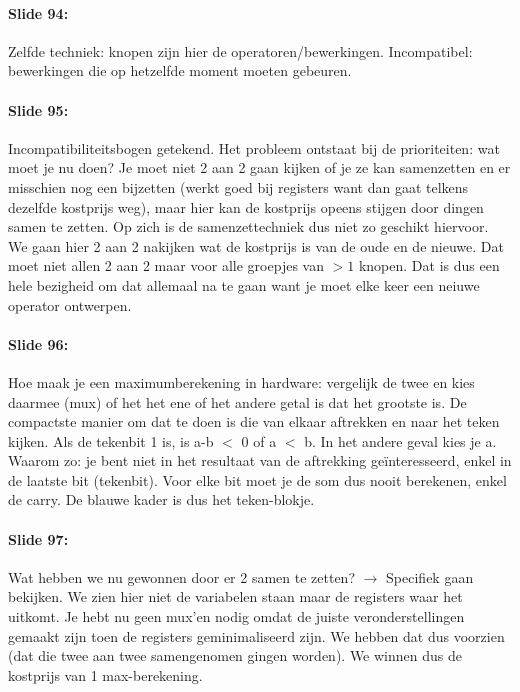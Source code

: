 \documentclass[10pt,a4paper]{book}
\begin{document}
\paragraph{Slide 94:} Zelfde techniek: knopen zijn hier de operatoren/bewerkingen. Incompatibel: bewerkingen die op hetzelfde moment moeten gebeuren.

\paragraph{Slide 95:} Incompatibiliteitsbogen getekend. Het probleem ontstaat bij de prioriteiten: wat moet je nu doen? Je moet niet 2 aan 2 gaan kijken of je ze kan samenzetten en er misschien nog een bijzetten (werkt goed bij registers want dan gaat telkens dezelfde kostprijs weg), maar hier kan de kostprijs opeens stijgen door dingen samen te zetten. Op zich is de samenzettechniek dus niet zo geschikt hiervoor.\\
We gaan hier 2 aan 2 nakijken wat de kostprijs is van de oude en de nieuwe. Dat moet niet allen 2 aan 2 maar voor alle groepjes van $>1$ knopen. Dat is dus een hele bezigheid om dat allemaal na te gaan want je moet elke keer een neiuwe operator ontwerpen.

\paragraph{Slide 96:} Hoe maak je een maximumberekening in hardware: vergelijk de twee en kies daarmee (mux) of het het ene of het andere getal is dat het grootste is. De compactste manier om dat te doen is die van elkaar aftrekken en naar het teken kijken. Als de tekenbit 1 is, is a-b $<$ 0 of a $<$ b. In het andere geval kies je a. Waarom zo: je bent niet in het resultaat van de aftrekking ge\"interesseerd, enkel in de laatste bit (tekenbit). Voor elke bit moet je de som dus nooit berekenen, enkel de carry. De blauwe kader is dus het teken-blokje. 

\paragraph{Slide 97:} Wat hebben we nu gewonnen door er 2 samen te zetten? $\rightarrow$ Specifiek gaan bekijken. We zien hier niet de variabelen staan maar de registers waar het uitkomt. Je hebt nu geen mux'en nodig omdat de juiste veronderstellingen gemaakt zijn toen de registers geminimaliseerd zijn. We hebben dat dus voorzien (dat die twee aan twee samengenomen gingen worden). We winnen dus de kostprijs van 1 max-berekening.
\end{document}
